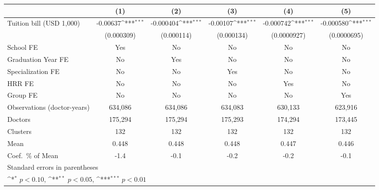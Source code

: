 {
\def\sym#1{\ifmmode^{#1}\else\(^{#1}\)\fi}
\begin{tabular}{l*{5}{c}}
\hline\hline
                    &\multicolumn{1}{c}{(1)}         &\multicolumn{1}{c}{(2)}         &\multicolumn{1}{c}{(3)}         &\multicolumn{1}{c}{(4)}         &\multicolumn{1}{c}{(5)}         \\
\hline
Tuition bill (USD 1,000)&    -0.00637\sym{***}&   -0.000404\sym{***}&    -0.00107\sym{***}&   -0.000742\sym{***}&   -0.000580\sym{***}\\
                    &  (0.000309)         &  (0.000114)         &  (0.000134)         & (0.0000927)         & (0.0000695)         \\
[1em]
School FE           &         Yes         &          No         &          No         &          No         &          No         \\
[1em]
Graduation Year FE  &          No         &         Yes         &          No         &          No         &          No         \\
[1em]
Specialization FE   &          No         &          No         &         Yes         &          No         &          No         \\
[1em]
HRR FE              &          No         &          No         &          No         &         Yes         &          No         \\
[1em]
Group FE            &          No         &          No         &          No         &          No         &         Yes         \\
\hline
Observations (doctor-years)&     634,086         &     634,086         &     634,083         &     630,133         &     623,916         \\
Doctors             &     175,294         &     175,294         &     175,293         &     174,294         &     173,445         \\
Clusters            &         132         &         132         &         132         &         132         &         132         \\
Mean                &       0.448         &       0.448         &       0.448         &       0.447         &       0.446         \\
Coef.\ \% of Mean   &        -1.4         &        -0.1         &        -0.2         &        -0.2         &        -0.1         \\
\hline\hline
\multicolumn{6}{l}{\footnotesize Standard errors in parentheses}\\
\multicolumn{6}{l}{\footnotesize \sym{*} \(p<0.10\), \sym{**} \(p<0.05\), \sym{***} \(p<0.01\)}\\
\end{tabular}
}
